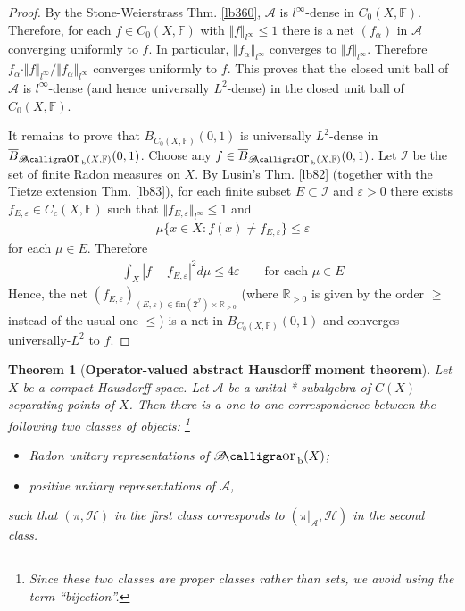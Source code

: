 \documentclass[12pt,b5paper,notitlepage]{article}
\theoremstyle{definition}
\theoremstyle{plain}
\newtheorem{thm}[df]{Theorem}
\DeclareMathOperator{\Borb}{{\mathscr{B}\text{\kern -2pt {\calligra\large or}}\,}_{\mathrm b}}
\newcommand{\ovl}{\overline}
\newcommand{\scr}{\mathscr}
\newcommand{\Rbb}{\mathbb R}
\newcommand{\fin}{\mathrm{fin}}
\newcommand{\Fbb}{\mathbb F}
\newcommand{\eps}{\varepsilon}
\newcommand{\MH}{\mathcal H}
\numberwithin{equation}{section}
\begin{document}
\begin{proof}
By the Stone-Weierstrass Thm. \ref{lb360}, $\scr A$ is $l^\infty$-dense in $C_0(X,\Fbb)$. Therefore, for each $f\in C_0(X,\Fbb)$ with $\Vert f\Vert_{l^\infty}\leq 1$ there is a net $(f_\alpha)$ in $\scr A$ converging uniformly to $f$. In particular, $\Vert f_\alpha\Vert_{l^\infty}$ converges to $\Vert f\Vert_{l^\infty}$. Therefore $f_\alpha\cdot \Vert f\Vert_{l^\infty}/\Vert f_\alpha\Vert_{l^\infty}$ converges uniformly to $f$. This proves that the closed unit ball of $\scr A$ is $l^\infty$-dense (and hence universally $L^2$-dense) in the closed unit ball of $C_0(X,\Fbb)$.

It remains to prove that $\ovl B_{C_0(X,\Fbb)}(0,1)$ is universally $L^2$-dense in $\ovl B_{\Borb(X,\Fbb)}(0,1)$. Choose any $f\in \ovl B_{\Borb(X,\Fbb)}(0,1)$. Let $\scr I$ be the set of finite Radon measures on $X$. By Lusin's Thm. \ref{lb82} (together with the Tietze extension Thm. \ref{lb83}), for each finite subset $E\subset\scr I$ and $\eps>0$ there exists $f_{E,\eps}\in C_c(X,\Fbb)$ such that $\Vert f_{E,\eps}\Vert_{l^\infty}\leq 1$ and
\begin{align*}
\mu\{x\in X:f(x)\neq f_{E,\eps}\}\leq\eps
\end{align*}
for each $\mu\in E$. Therefore
\begin{align*}
\int_X|f-f_{E,\eps}|^2d\mu\leq 4\eps\qquad\text{for each }\mu\in E
\end{align*}
Hence, the net $(f_{E,\eps})_{(E,\eps)\in\fin(2^{\scr I})\times\Rbb_{>0}}$ (where $\Rbb_{>0}$ is given by the order $\geq$ instead of the usual one $\leq$) is a net in $\ovl B_{C_0(X,\Fbb)}(0,1)$ and converges universally-$L^2$ to $f$.
\end{proof}




\begin{thm}[\textbf{Operator-valued abstract Hausdorff moment theorem}]\label{lb274}
Let $X$ be a compact Hausdorff space. Let $\scr A$ be a unital *-subalgebra of $C(X)$ separating points of $X$. Then there is a one-to-one correspondence between the following two classes of objects: \footnote{Since these two classes are proper classes rather than sets, we avoid using the term ``bijection''.}
\begin{itemize}
\item[(1)] Radon unitary representations of $\Borb(X)$;
\item[(2)] positive unitary representations of $\scr A$,
\end{itemize}
such that $(\pi,\MH)$ in the first class corresponds to $(\pi|_{\scr A},\MH)$ in the second class.
\end{thm}
\end{document}
